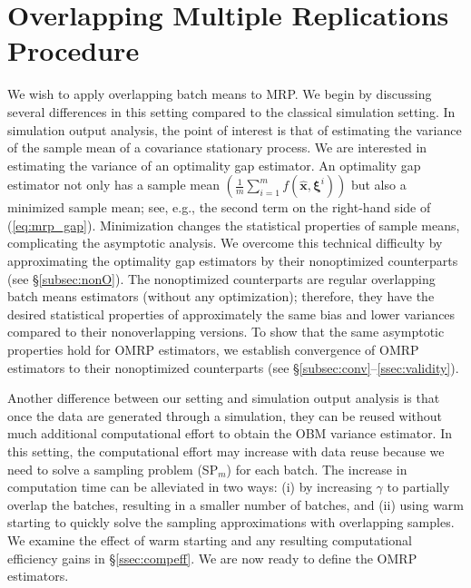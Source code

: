 \documentclass[12pt]{article}
\newcommand{\X}{X}
\newcommand{\x}{\mathbf{x}}
\newcommand{\xh}{{\hat{\x}}}
\newcommand{\xit}{\boldsymbol{\xi}}
\newcommand{\xiti}{\xit^i}
\begin{document}
\section{Overlapping Multiple Replications Procedure} 
\label{sec:omrp}

We wish to apply overlapping batch means to MRP. 
We begin by discussing several differences in this setting compared to the classical simulation setting.  
In simulation output analysis, the point of interest is that of estimating the variance of the sample mean of a covariance stationary process.  
We are interested in estimating the variance of an optimality gap estimator.  
An optimality gap estimator not only has a sample mean $(\frac{1}{m} \sum_{i=1}^m f(\xh,\xiti))$ but also a minimized sample mean; see, e.g., the second term on the right-hand side of (\ref{eq:mrp_gap}).  
Minimization changes the statistical properties of sample means, complicating the asymptotic analysis.  
We overcome this technical difficulty by approximating the optimality gap estimators by their nonoptimized counterparts (see \S \ref{subsec:nonO}).  
The nonoptimized counterparts are regular overlapping batch means estimators (without any optimization); therefore, they have the desired statistical properties of approximately the same bias and lower variances compared to their nonoverlapping versions. 
To show that the same asymptotic properties hold for OMRP estimators, we establish convergence of OMRP estimators to their nonoptimized counterparts (see \S \ref{subsec:conv}--\ref{ssec:validity}). 

Another difference between our setting and simulation output analysis is that once the data are generated through a simulation, they can be reused without much additional computational effort to obtain the OBM variance estimator.  
In this setting, the computational effort may increase with data reuse because we need to solve a sampling problem (SP$_m$) for each batch.  
The increase in computation time can be alleviated in two ways: (i) by increasing $\gamma$ to partially overlap the batches, resulting in a smaller number of batches, and (ii) using warm starting to quickly solve the sampling approximations with overlapping samples. 
We examine the effect of warm starting and any resulting computational efficiency gains in \S \ref{ssec:compeff}. 
We are now ready to define the OMRP estimators.  
\end{document}
